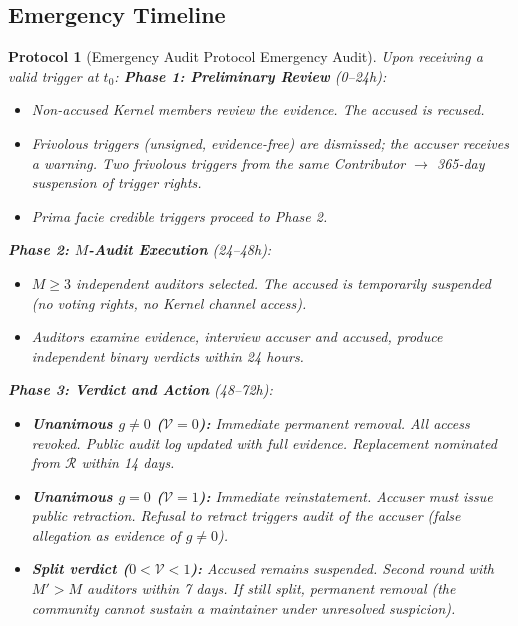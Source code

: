 \documentclass[12pt,a4paper]{article}
\newtheorem{protocol}[theorem]{Protocol}
\theoremstyle{definition}
\newcommand{\RotationPool}{\mathcal{R}}
\newcommand{\gzero}{g=0}
\newcommand{\gnonzero}{g \neq 0}
\newcommand{\AuditResult}{\mathcal{V}}
\begin{document}
\subsection{Emergency Timeline}
\begin{protocol}[Emergency Audit Protocol Emergency Audit]
\label{prot:emergency}
Upon receiving a valid trigger at $t_0$:
\noindent\textbf{Phase 1: Preliminary Review} (0--24h):
\begin{itemize}
    \item Non-accused Kernel members review the evidence. The accused is recused.
    \item Frivolous triggers (unsigned, evidence-free) are dismissed; the accuser receives a warning. Two frivolous triggers from the same Contributor $\to$ 365-day suspension of trigger rights.
    \item Prima facie credible triggers proceed to Phase 2.
\end{itemize}
\noindent\textbf{Phase 2: $M$-Audit Execution} (24--48h):
\begin{itemize}
    \item $M \geq 3$ independent auditors selected. The accused is temporarily suspended (no voting rights, no Kernel channel access).
    \item Auditors examine evidence, interview accuser and accused, produce independent binary verdicts within 24 hours.
\end{itemize}
\noindent\textbf{Phase 3: Verdict and Action} (48--72h):
\begin{itemize}
    \item \textbf{Unanimous $\gnonzero$ ($\AuditResult = 0$):} Immediate permanent removal. All access revoked. Public audit log updated with full evidence. Replacement nominated from $\RotationPool$ within 14 days.
    \item \textbf{Unanimous $\gzero$ ($\AuditResult = 1$):} Immediate reinstatement. Accuser must issue public retraction. Refusal to retract triggers audit of the accuser (false allegation as evidence of $\gnonzero$).
    \item \textbf{Split verdict ($0 < \AuditResult < 1$):} Accused remains suspended. Second round with $M' > M$ auditors within 7 days. If still split, permanent removal (the community cannot sustain a maintainer under unresolved suspicion).
\end{itemize}
\end{protocol}
\end{document}
